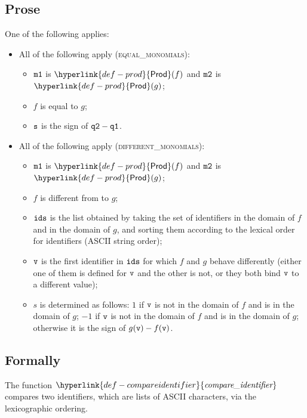 \documentclass{book}
\newcommand\compareidentifier[0]{\hyperlink{def-compareidentifier}{\textfunc{compare\_identifier}}}
\newcommand\Prod[0]{\hyperlink{def-prod}{\textsf{Prod}}}
\begin{document}
\subsection{Prose}
One of the following applies:
\begin{itemize}
  \item All of the following apply (\textsc{equal\_monomials}):
  \begin{itemize}
    \item $\texttt{m1}$ is $\Prod(f)$ and $\texttt{m2}$ is $\Prod(g)$;
    \item $f$ is equal to $g$;
    \item $\texttt{s}$ is the sign of $\texttt{q2} - \texttt{q1}$.
  \end{itemize}

  \item All of the following apply (\textsc{different\_monomials}):
  \begin{itemize}
    \item $\texttt{m1}$ is $\Prod(f)$ and $\texttt{m2}$ is $\Prod(g)$;
    \item $f$ is different from to $g$;
    \item $\texttt{ids}$ is the list obtained by taking the set of identifiers in the domain of $f$ and in the domain of $g$,
          and sorting them according to the lexical order for identifiers (ASCII string order);
    \item $\texttt{v}$ is the first identifier in $\texttt{ids}$ for which $f$ and $g$ behave differently (either one of them is defined
          for $\texttt{v}$ and the other is not, or they both bind $\texttt{v}$ to a different value);
    \item $s$ is determined as follows: $1$ if $\texttt{v}$ is not in the domain of $f$ and is in the domain of $g$;
          $-1$ if $\texttt{v}$ is not in the domain of $f$ and is in the domain of $g$;
          otherwise it is the sign of $g(\texttt{v})-f(\texttt{v})$.
  \end{itemize}
\end{itemize}

\subsection{Formally}
\hypertarget{def-compareidentifier}{}
The function $\compareidentifier$ compares two identifiers, which are lists of ASCII characters,
via the lexicographic ordering.
\end{document}

